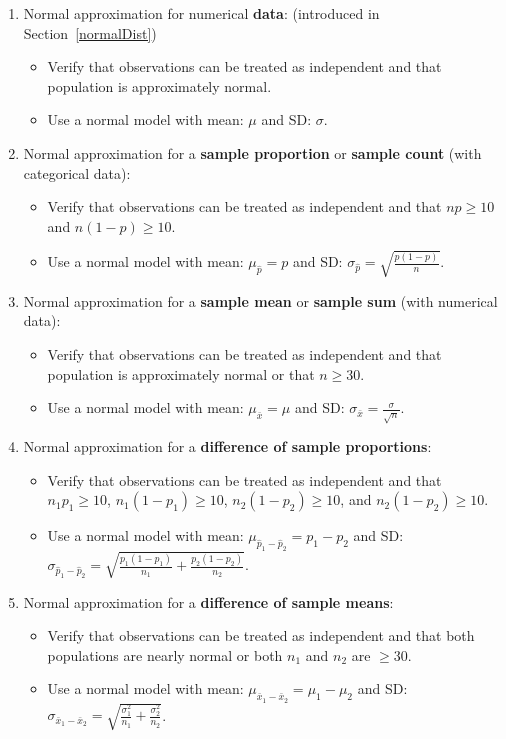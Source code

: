 \begin{enumerate}

\item Normal approximation for numerical \textbf{data}:  (introduced in Section~\ref{normalDist})
\begin{itemize}
\item Verify that observations can be treated as independent and that population is approximately normal.
\item Use a normal model with mean: $\mu$ and SD: $\sigma$.
\end{itemize}

\item Normal approximation for a \textbf{sample proportion} or \textbf{sample count} (with categorical data):  
\begin{itemize}
\item Verify that observations can be treated as independent and that $np\ge 10$ and $n(1-p)\ge 10$.
\item Use a normal model with mean: $\mu_{\hat{p}} = p$ and SD: $\sigma_{\hat{p}} = \sqrt{\frac{p(1-p)}{n}}$.
\end{itemize}


\item Normal approximation for a \textbf{sample mean} or \textbf{sample sum} (with numerical data): 
\begin{itemize} 
\item Verify that observations can be treated as independent and that population is approximately normal or that $n\ge 30$.
\item Use a normal model with mean: $\mu_{\bar{x}}=\mu$ and SD: $\sigma_{\bar{x}}=\frac{\sigma}{\sqrt{n}}$.
\end{itemize}

\item  Normal approximation for a \textbf{difference of sample proportions}:
\begin{itemize}
\item Verify that observations can be treated as independent and that  \\$n_1p_1\ge 10$, $n_1(1-p_1)\ge 10$, $n_2(1-p_2)\ge 10$, and $n_2(1-p_2)\ge 10$.
\item Use a normal model with mean: $\mu_{\hat{p}_1-\hat{p}_2} = p_1-p_2$ and SD: $\sigma_{\hat{p}_1-\hat{p}_2}=  \sqrt{\frac{p_1(1-p_1)}{n_1} + \frac{p_2(1-p_2)}{n_2}}$.
\end{itemize}


\item  Normal approximation for a \textbf{difference of sample means}:
\begin{itemize}
\item Verify that observations can be treated as independent and that both populations are nearly normal or both $n_1$ and $n_2$ are $\ge 30$.  
\item Use a normal model with mean: $\mu_{\bar{x}_1 - \bar{x}_2} = \mu_1 - \mu_2$ and SD: $\sigma_{\bar{x}_1 - \bar{x}_2}= \sqrt{\frac{\sigma_1^2}{n_1} + \frac{\sigma_2^2}{n_2}}$.
\end{itemize}

\end{enumerate}


